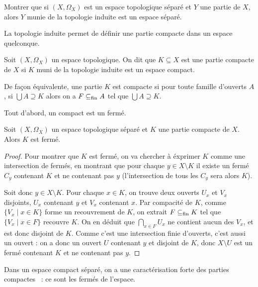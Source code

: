 \begin{exercise}
  Montrer que si $(X,\Omega_X)$ est un espace topologique séparé et $Y$ une
  partie de $X$, alors $Y$ munie de la topologie induite est un espace séparé.
\end{exercise}

La topologie induite permet de définir une partie compacte dans un espace
quelconque.

\begin{definition}
  Soit $(X,\Omega_X)$ un espace topologique. On dit que $K\subseteq X$ est une
  partie compacte de $X$ si $K$ muni de la topologie induite est un espace
  compact.
\end{definition}

\begin{remark}
  De façon équivalente, une partie $K$ est compacte si pour toute famille
  d'ouverts $A$, si $\bigcup A \supseteq K$ alors on a $F\subseteq_{\mathrm{fin}} A$ tel que
  $\bigcup A \supseteq K$.
\end{remark}

Tout d'abord, un compact est un fermé.

\begin{property}
  Soit $(X,\Omega_X)$ un espace topologique séparé et $K$ une partie compacte de
  $X$. Alors $K$ est fermé.
\end{property}

\begin{proof}
  Pour montrer que $K$ est fermé, on va chercher à éxprimer $K$ comme une
  intersection de fermés, en montrant que pour chaque $y\in X\setminus K$ il
  existe un fermé $C_y$ contenant $K$ et ne contenant pas $y$ (l'intersection
  de tous les $C_y$ sera alors $K$).

  Soit donc $y\in X\setminus K$. Pour chaque $x\in K$, on trouve deux ouverts
  $U_x$ et $V_x$ disjoints, $U_x$ contenant $y$ et $V_x$ contenant $x$. Par
  compacité de $K$, comme $\{V_x\mid x \in K\}$ forme un recouvrement de $K$,
  on extrait $F\subseteq_{\mathrm{fin}} K$ tel que $\{V_x\mid x \in F\}$ recouvre $K$.
  On en déduit que $\displaystyle\bigcap_{x\in F}U_x$ ne contient aucun des
  $V_x$, et est donc disjoint de $K$. Comme c'est une intersection finie
  d'ouverts, c'est aussi un ouvert : on a donc un ouvert $U$ contenant
  $y$ et disjoint de $K$, donc $X\setminus U$ est un fermé contenant $K$ et
  ne contenant pas $y$.
\end{proof}

Dans un espace compact séparé, on a une caractérisation forte des parties
compactes~ : ce sont les fermés de l'espace.

